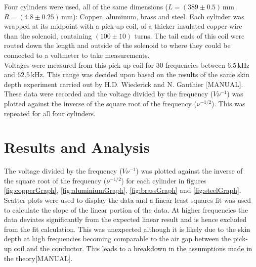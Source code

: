 \documentclass[a4paper,12pt,twocolumn]{article}
\begin{document}
	Four cylinders were used, all of the same dimensions ($L = (389 \pm 0.5)\,\text{mm}$ $R = (4.8 \pm 0.25)\,\text{mm}$): Copper, aluminum, brass and steel. Each cylinder was wrapped at its midpoint with a pick-up coil, of a thicker insulated copper wire than the solenoid, containing $(100 \pm 10)$ turns. The tail ends of this coil were routed down the length and outside of the solenoid to where they could be connected to a voltmeter to take measurements.\\
	
	Voltages were measured from this pick-up coil for 30 frequencies between $6.5 \,\text{kHz}$ and $62.5 \,\text{kHz}$. This range was decided upon based on the results of the same skin depth experiment carried out by H.D. Wiederick and N. Gauthier [MANUAL]. These data were recorded and the voltage divided by the frequency ($V \nu^{-1}$) was plotted against the inverse of the square root of the frequency ($\nu ^{-1/2}$). This was repeated for all four cylinders.
	
\section{Results and Analysis}
	
	The voltage divided by the frequency ($V \nu^{-1}$) was plotted against the inverse of the square root of the frequency ($\nu ^{-1/2}$) for each cylinder in figures \ref{fig:copperGraph}, \ref{fig:aluminiumGraph}, \ref{fig:brassGraph} and \ref{fig:steelGraph}. Scatter plots were used to display the data and a linear least squares fit was used to calculate the slope of the linear portion of the data. At higher frequencies the data deviates significantly from the expected linear result and is hence excluded from the fit calculation. This was unexpected although it is likely due to the skin depth at high frequencies becoming comparable to the air gap between the pick-up coil and the conductor. This leads to a breakdown in the assumptions made in the theory[MANUAL].\\
	
	\begin{table}[]
		\centering
		\captionsetup{font=scriptsize}
		\caption{The calculated conductivity for each metal cylinder. The uncertainties shown were calculated using error propagation. See appendix [PYTHON ERROR]}
		\label{tab:conductivity}
	\end{table}
	
\end{document}
